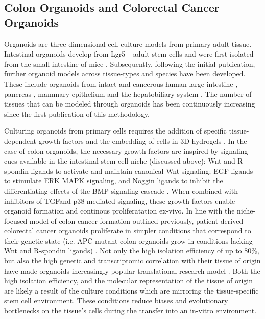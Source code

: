 \begin{flushleft}
\section{Colon Organoids and Colorectal Cancer Organoids}

Organoids are three-dimensional cell culture models from primary adult tissue. Intestinal organoids develop from Lgr5+ adult stem cells and were first isolated from the small intestine of mice \cite{Sato2011}. Subsequently, following the initial publication, further organoid models across tissue-types and species have been developed. These include organoids from intact and cancerous human large intestine \cite{Sato2011}, pancreas \cite{Sachs2017}, mammary epithelium \cite{Zhang2016EstablishingCells, Sachs2017AHeterogeneity} and the hepatobiliary system \cite{Huch2013NIHAccess, Broutier2016CultureManipulation.}. The number of tissues that can be modeled through organoids has been continuously increasing since the first publication of this methodology. \par

Culturing organoids from primary cells requires the addition of specific tissue-dependent growth factors and the embedding of cells in 3D hydrogels \cite{Merker2016GastrointestinalOut}. In the case of colon organoids, the necessary growth factors are inspired by signaling cues available in the intestinal stem cell niche (discussed above): Wnt and R-spondin ligands to activate and maintain canonical Wnt signaling; EGF ligands to stimulate ERK MAPK signaling, and Noggin ligands to inhibit the differentiating effects of the BMP signaling cascade \cite{Sato2013}. When combined with inhibitors of TGF\textbeta and p38 mediated signaling, these growth factors enable organoid formation and continous proliferatation ex-vivo. In line with the niche-focused model of colon cancer formation outlined previously, patient derived colorectal cancer organoids proliferate in simpler conditions that correspond to their genetic state (i.e. APC mutant colon organoids grow in conditions lacking Wnt and R-spondin ligands) \cite{Fujii2016-de}. Not only the high isolation efficiency of up to 80\%, but also the high genetic and transcriptomic correlation with their tissue of origin have made organoids increasingly popular translational research model \cite{pauliPersonalizedVitroVivo2017a}. Both the high isolation efficiency, and the molecular representation of the tissue of origin are likely a result of the culture conditions which are mirroring the tissue-specific stem cell environment. These conditions reduce biases and evolutionary bottlenecks on the tissue's cells during the transfer into an in-vitro environment. \par


\end{flushleft}
